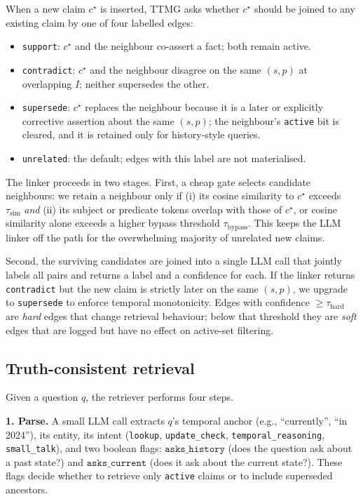 When a new claim $c^{\star}$ is inserted, TTMG asks whether
$c^{\star}$ should be joined to any existing claim by one of four
labelled edges:
\begin{itemize}
  \item \texttt{support}: $c^{\star}$ and the neighbour co-assert a
  fact; both remain active.
  \item \texttt{contradict}: $c^{\star}$ and the neighbour disagree on
  the same $(s,p)$ at overlapping $I$; neither supersedes the other.
  \item \texttt{supersede}: $c^{\star}$ replaces the neighbour because
  it is a later or explicitly corrective assertion about the same
  $(s,p)$; the neighbour's \texttt{active} bit is cleared, and it is
  retained only for history-style queries.
  \item \texttt{unrelated}: the default; edges with this label are
  not materialised.
\end{itemize}

The linker proceeds in two stages. First, a cheap gate selects
candidate neighbours: we retain a neighbour only if (i) its cosine
similarity to $c^{\star}$ exceeds $\tau_{\text{sim}}$ \emph{and} (ii)
its subject or predicate tokens overlap with those of $c^{\star}$, or
cosine similarity alone exceeds a higher bypass threshold
$\tau_{\text{bypass}}$. This keeps the LLM linker off the path for
the overwhelming majority of unrelated new claims.

Second, the surviving candidates are joined into a single LLM call
that jointly labels all pairs and returns a label and a confidence for
each. If the linker returns \texttt{contradict} but the new claim is
strictly later on the same $(s,p)$, we upgrade to \texttt{supersede}
to enforce temporal monotonicity. Edges with confidence $\geq
\tau_{\text{hard}}$ are \emph{hard} edges that change retrieval
behaviour; below that threshold they are \emph{soft} edges that are
logged but have no effect on active-set filtering.

\subsection{Truth-consistent retrieval}
\label{ssec:retrieve}

Given a question $q$, the retriever performs four steps.

\textbf{1. Parse.} A small LLM call extracts $q$'s temporal anchor
(e.g., ``currently'', ``in 2024''), its entity, its intent
(\texttt{lookup}, \texttt{update\_check},
\texttt{temporal\_reasoning}, \texttt{small\_talk}), and two boolean
flags: $\texttt{asks\_history}$ (does the question ask about a past
state?) and $\texttt{asks\_current}$ (does it ask about the current
state?). These flags decide whether to retrieve only \texttt{active}
claims or to include superseded ancestors.

